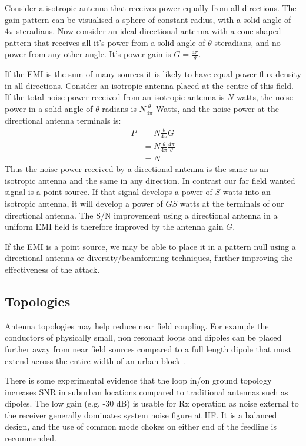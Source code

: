 \documentclass{article}
\begin{document}
Consider a isotropic antenna that receives power equally from all directions.  The gain pattern can be visualised a sphere of constant radius, with a solid angle of $4 \pi$ steradians. Now consider an ideal directional antenna with a cone shaped pattern that receives all it's power from a solid angle of $\theta$ steradians, and no power from any other angle.  It's power gain is $G=\frac{4 \pi}{\theta}$. 

If the EMI is the sum of many sources it is likely to have equal power flux density in all directions.  Consider an isotropic antenna placed at the centre of this field. If the total noise power received from an isotropic antenna is $N$ watts, the noise power in a solid angle of $\theta$ radians is $N \frac{\theta}{4 \pi}$ Watts, and the noise power at the directional antenna terminals is:
\begin{equation}
\begin{split}
 P &= N \frac{\theta}{4 \pi} G \\
   &= N \frac{\theta}{4 \pi} \frac{4 \pi}{\theta} \\
   &= N
\end{split}
\end{equation}
Thus the noise power received by a directional antenna is the same as an isotropic antenna and the same in any direction. In contrast our far field wanted signal is a point source. If that signal develops a power of $S$ watts into an isotropic antenna, it will develop a power of $GS$ watts at the terminals of our directional antenna. The S/N improvement using a directional antenna in a uniform EMI field is therefore improved by the antenna gain $G$.

If the EMI is a point source, we may be able to place it in a pattern null using a directional antenna or diversity/beamforming techniques, further improving the effectiveness of the attack.

\subsection{Topologies}

Antenna topologies may help reduce near field coupling.  For example the conductors of physically small, non resonant loops and dipoles can be placed further away from near field sources compared to a full length dipole that must extend across the entire width of an urban block \cite{lz1aq}.

There is some experimental evidence that the loop in/on ground topology \cite{k5jy_log}\cite{duffy_lig} increases SNR in suburban locations compared to traditional antennas such as dipoles.  The low gain (e.g. -30 dB) is usable for Rx operation as noise external to the receiver generally dominates system noise figure at HF.   It is a balanced design, and the use of common mode chokes on either end of the feedline is recommended.
\end{document}
